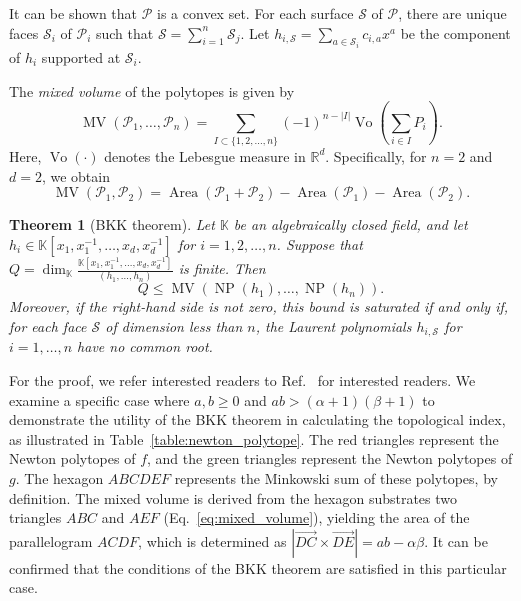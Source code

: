 \documentclass[aps,prl,english,superscriptaddress,twocolumn,tightenlines,showpacs,longbibliography,floatfix,amsfonts]{revtex4-2}
\newtheorem{thm}{Theorem}
\begin{document}
It can be shown that $\mathcal{P}$ is a convex set. For each surface $\mathcal{S}$ of $\mathcal{P}$, there are unique faces $\mathcal{S}_i$ of $\mathcal{P}_i$ such that $\mathcal{S} = \sum_{i=1}^n\mathcal{S}_j$. Let $h_{i,\mathcal{S}}=\sum_{a\in\mathcal{S}_i}c_{i,a}x^a$ be the component of $h_i$ supported at $\mathcal{S}_i$.

The \textit{mixed volume} of the polytopes is given by
\begin{equation}
	\mathop{MV}(\mathcal{P}_1,\dots,\mathcal{P}_n) = \sum_{I \subset \{1,2,\dots,n\}}(-1)^{n-|I|}\mathop{Vol_d}\left(\sum_{i\in I}P_i\right).
\end{equation}
Here, $\mathop{Vol_d}(\cdot)$ denotes the Lebesgue measure in $\mathbb{R}^d$. Specifically, for $n=2$ and $d=2$, we obtain
\begin{equation}\label{eq:mixed_volume}
	\mathop{MV}(\mathcal{P}_1,\mathcal{P}_2) = \mathop{Area}(\mathcal{P}_1+\mathcal{P}_2) - \mathop{Area}(\mathcal{P}_1)-\mathop{Area}(\mathcal{P}_2).
\end{equation}

\begin{thm}[BKK theorem]
	Let $\mathbb{K}$ be an algebraically closed field, and let $h_i \in \mathbb{K}[x_1,x_1^{-1}, \dots, x_d,x_d^{-1}]$ for $i=1,2,\dots,n$. Suppose that $Q = \dim_{\mathbb{K}}\frac{\mathbb{K}[x_1,x_1^{-1}, \dots, x_d,x_d^{-1}]}{(h_1,\dots,h_n)}$ is finite. Then
	\begin{equation}\label{eq:BBK}
		Q \leq \mathop{MV}\left(\mathop{NP}(h_1), \dots,\mathop{NP}(h_n)\right).
	\end{equation}
	Moreover, if the right-hand side is not zero, this bound is saturated if and only if, for each face $\mathcal{S}$ of dimension less than $n$, the Laurent polynomials $h_{i,\mathcal{S}}$ for $i=1,\dots,n$  have no common root. 
\end{thm}

For the proof, we refer interested readers to Ref.~\cite{mondal21} for interested readers. We examine a specific case where $a,b \geq 0$ and $ab>(\alpha+1)(\beta+1)$ to demonstrate the utility of the BKK theorem in calculating the topological index, as illustrated in Table~\ref{table:newton_polytope}. The red triangles represent the Newton polytopes of $f$, and the green triangles represent the Newton polytopes of $g$. The hexagon $ABCDEF$ represents the Minkowski sum of these polytopes, by definition. The mixed volume is derived from the hexagon substrates two triangles $ABC$ and $AEF$ (Eq.~\eqref{eq:mixed_volume}), yielding the area of the parallelogram $ACDF$, which is determined as $|\overrightarrow{DC}\times \overrightarrow{DE}|=ab-\alpha\beta$. It can be confirmed that the conditions of the BKK theorem are satisfied in this particular case.
\end{document}
